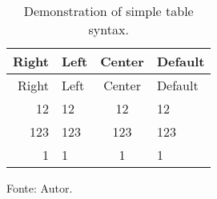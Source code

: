 \begin{longtable}[]{@{}rlcl@{}}
\caption{Demonstration of simple table syntax.
\label{mytable}}\tabularnewline
\toprule
Right & Left & Center & Default\tabularnewline
\midrule
\endfirsthead
\toprule
Right & Left & Center & Default\tabularnewline
\midrule
\endhead
12 & 12 & 12 & 12\tabularnewline
123 & 123 & 123 & 123\tabularnewline
1 & 1 & 1 & 1\tabularnewline
\bottomrule
\end{longtable}

Fonte: Autor.
